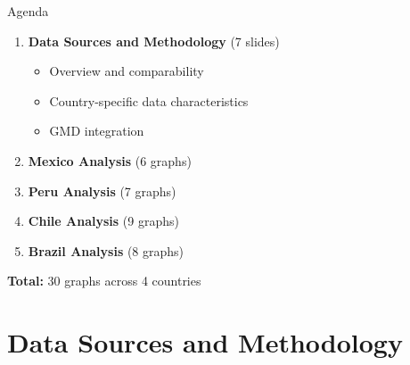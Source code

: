 \documentclass[aspectratio=169,11pt]{beamer}
\begin{document}
\begin{frame}{Agenda}
\Large
\begin{enumerate}
    \item \textbf{Data Sources and Methodology} (7 slides)
    \begin{itemize}
        \normalsize
        \item Overview and comparability
        \item Country-specific data characteristics
        \item GMD integration
    \end{itemize}

    \vspace{0.3cm}
    \item \textbf{Mexico Analysis} (6 graphs)

    \vspace{0.3cm}
    \item \textbf{Peru Analysis} (7 graphs)

    \vspace{0.3cm}
    \item \textbf{Chile Analysis} (9 graphs)

    \vspace{0.3cm}
    \item \textbf{Brazil Analysis} (8 graphs)
\end{enumerate}

\vspace{0.5cm}
\normalsize
\textbf{Total:} 30 graphs across 4 countries
\end{frame}


\section{Data Sources and Methodology}
\end{document}
